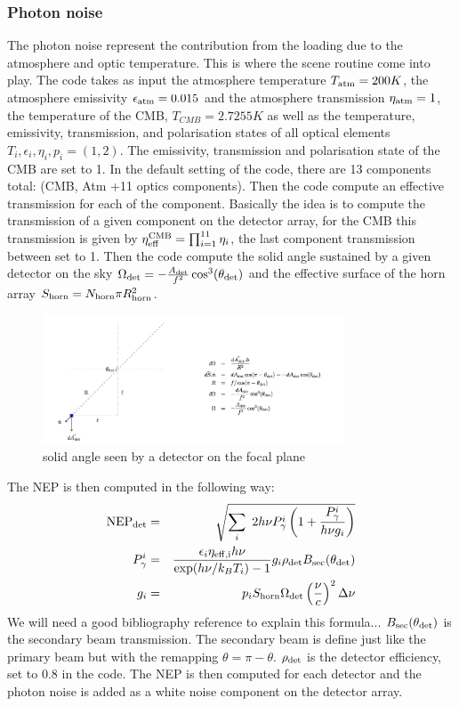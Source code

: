 \documentclass[a4paper, 11pt]{article}
\def\ba{\begin{eqnarray}}
\def\ea{\end{eqnarray}}
\begin{document}
\subsubsection{Photon noise}

The photon noise represent the contribution from the loading due to the atmosphere and optic temperature. This is where the scene routine come into play.
The code takes as input the atmosphere temperature $T_{\rm atm}=200 K$, the atmosphere emissivity $\epsilon_{\rm atm}=0.015$ and the atmosphere transmission $\eta_{\rm atm}=1$, the temperature of the CMB, $T_{CMB}=2.7255 K$ as well as the temperature,  emissivity,  transmission, and polarisation states of all optical elements $T_{i}, \epsilon_{i}, \eta_{i},p_{i}=(1,2)$. The emissivity, transmission and polarisation state of the CMB are set to 1.
In the default setting of the code, there are 13 components total: (CMB, Atm +11 optics components).
Then the code compute an effective transmission for each of the component. Basically the idea is to compute the transmission of a given component on the detector array, for the CMB this transmission is given by $\eta^{\rm CMB}_{\rm eff} = \prod^{11}_{i=1} \eta_{i} $, the last component transmission between set to 1.
Then the code compute the solid angle sustained by a given detector on the sky $\Omega_{\rm det}= -\frac{A_{\rm det}}{f^{2}} \cos^{3}(\theta_{\rm det}) $ and the effective surface of the horn array $S_{\rm horn}= N_{\rm horn} \pi R^{2}_{\rm horn}$.
\begin{figure}
  \centering
  \includegraphics[width=0.8\textwidth]{solid_angle.png}
  \caption{solid angle seen by a detector on the focal plane}
  \label{fig:solid_angle}
\end{figure}

The NEP is then computed in the following way:
\ba
{\rm NEP}_{\rm \det} &=& \sqrt{ \sum_{i} 2h\nu P^{i}_{\gamma} \left(1+\frac{P^{i}_{\gamma}}{h \nu g_{i}} \right)} \\
P^{i}_{\gamma} &=& \frac{\epsilon_{i}\eta_{\rm eff,i}h\nu}{\exp (h \nu/k_{B}T_{i}) -1} g_{i} \rho_{\rm \det} B_{\rm sec}(\theta_{\rm det}) \\
g_{i} &=& p_{i} S_{\rm horn} \Omega_{\rm det} \left(\frac{\nu}{c} \right)^{2} \Delta \nu
\ea
We will need a good bibliography reference to explain this formula...
$B_{\rm sec}(\theta_{\rm det})$ is the secondary beam transmission. The secondary beam is define just like the primary beam but with the remapping $\theta=\pi-\theta$. $\rho_{\rm \det}$ is the detector efficiency, set to 0.8 in the code.
The NEP is then computed for each detector and the photon noise is added as a white noise component on the detector array.
\end{document}
